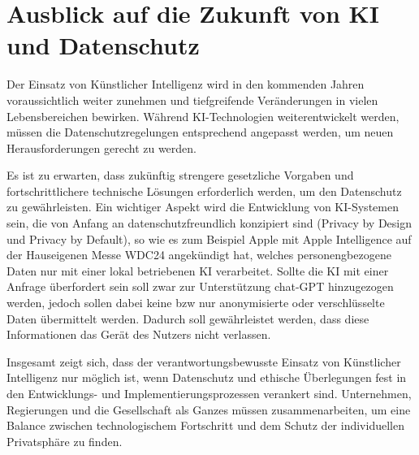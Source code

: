 \chapter{Ausblick auf die Zukunft von KI und Datenschutz}

Der Einsatz von Künstlicher Intelligenz wird in den kommenden Jahren
voraussichtlich weiter zunehmen und tiefgreifende Veränderungen in vielen
Lebensbereichen bewirken. Während KI-Technologien weiterentwickelt werden,
müssen die Datenschutzregelungen entsprechend angepasst werden, um neuen
Herausforderungen gerecht zu werden.

Es ist zu erwarten, dass zukünftig strengere gesetzliche Vorgaben und
fortschrittlichere technische Lösungen erforderlich werden, um den Datenschutz
zu gewährleisten. Ein wichtiger Aspekt wird die Entwicklung von KI-Systemen
sein, die von Anfang an datenschutzfreundlich konzipiert sind (Privacy by Design
und Privacy by Default), so wie es zum Beispiel Apple mit Apple Intelligence auf
der Hauseigenen Messe WDC24 angekündigt hat, welches personengbezogene Daten nur
mit einer lokal betriebenen KI verarbeitet. Sollte die KI mit einer Anfrage
überfordert sein soll zwar zur Unterstützung chat-GPT hinzugezogen werden,
jedoch sollen dabei keine bzw nur anonymisierte oder verschlüsselte Daten
übermittelt werden. Dadurch soll gewährleistet werden, dass diese Informationen
das Gerät des Nutzers nicht verlassen.

Insgesamt zeigt sich, dass der verantwortungsbewusste Einsatz von Künstlicher
Intelligenz nur möglich ist, wenn Datenschutz und ethische Überlegungen fest in
den Entwicklungs- und Implementierungsprozessen verankert sind. Unternehmen,
Regierungen und die Gesellschaft als Ganzes müssen zusammenarbeiten, um eine
Balance zwischen technologischem Fortschritt und dem Schutz der individuellen
Privatsphäre zu finden.

\cite{mindverse2024}

